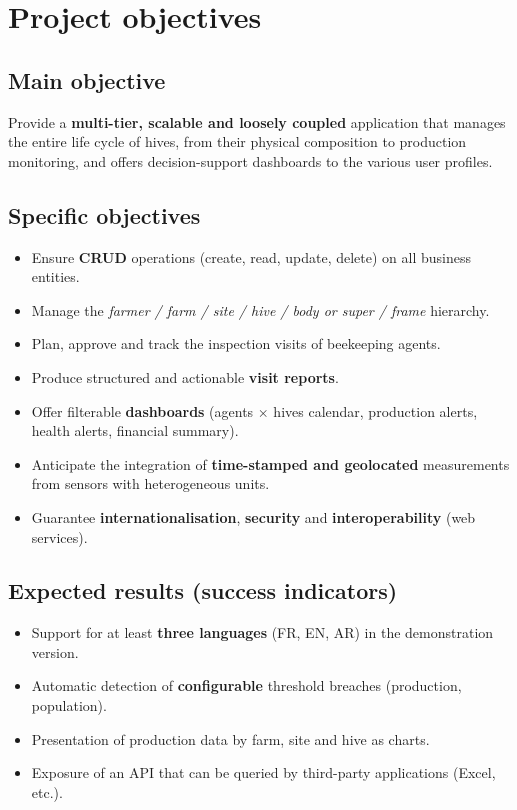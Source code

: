 \chapter{Project objectives}

\section{Main objective}
Provide a \textbf{multi-tier, scalable and loosely coupled} application that
manages the entire life cycle of hives, from their physical composition to
production monitoring, and offers decision-support dashboards to the various
user profiles.

\section{Specific objectives}
\begin{itemize}
  \item Ensure \textbf{CRUD} operations (create, read, update, delete) on all business entities.
  \item Manage the \emph{farmer / farm / site / hive / body or super / frame} hierarchy.
  \item Plan, approve and track the inspection visits of beekeeping agents.
  \item Produce structured and actionable \textbf{visit reports}.
  \item Offer filterable \textbf{dashboards} (agents $\times$ hives calendar, production alerts, health alerts, financial summary).
  \item Anticipate the integration of \textbf{time-stamped and geolocated} measurements from sensors with heterogeneous units.
  \item Guarantee \textbf{internationalisation}, \textbf{security} and \textbf{interoperability} (web services).
\end{itemize}

\section{Expected results (success indicators)}
\begin{itemize}
  \item Support for at least \textbf{three languages} (FR, EN, AR) in the demonstration version.
  \item Automatic detection of \textbf{configurable} threshold breaches (production, population).
  \item Presentation of production data by farm, site and hive as charts.
  \item Exposure of an API that can be queried by third-party applications (Excel, etc.).
\end{itemize}
